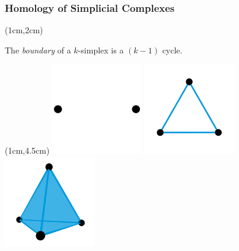 \begin{frame}
  \frametitle{Homology of Simplicial Complexes}

  \begin{textblock*}{11cm}(1cm,2cm)
    \begin{small}
      The \emph{boundary} of a $k$-simplex is a $(k-1)$ cycle.\vspace{1ex}

    \end{small}
  \end{textblock*}

  \begin{textblock*}{11cm}(1cm,4.5cm)
    \includegraphics[trim=0 0 -400 0, clip, width=0.3\textwidth]{figures/edge_bdy}
    \includegraphics[trim=0 0 -200 0, clip, width=0.3\textwidth]{figures/tri_loop}
    \includegraphics[trim=-200 0 0 0, clip, width=0.3\textwidth]{figures/tet_void}
  \end{textblock*}
\end{frame}
